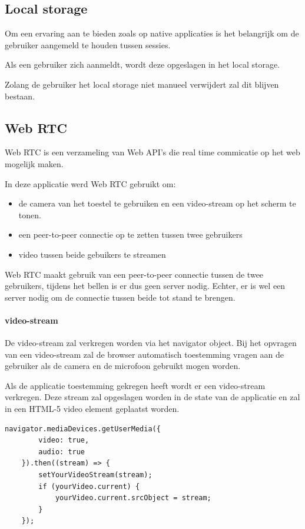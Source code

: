 	\subsection{Local storage}
		
		Om een ervaring aan te bieden zoals op native applicaties is het belangrijk om de gebruiker aangemeld te houden tussen sessies.
		
		Als een gebruiker zich aanmeldt, wordt deze opgeslagen in het local storage.
		
		Zolang de gebruiker het local storage niet manueel verwijdert zal dit blijven bestaan. 
		\autocite{Mozilla2020d}
		
	\subsection{Web RTC}
		
		Web RTC is een verzameling van Web API's die real time commicatie op het web mogelijk maken. 
		
		In deze applicatie werd Web RTC gebruikt om:
		\begin{itemize}
			\item de camera van het toestel te gebruiken en een video-stream op het scherm te tonen.
			\item een peer-to-peer connectie op te zetten tussen twee gebruikers
			\item video tussen beide gebuikers te streamen
		\end{itemize} 
		\autocite{webRTC2020}
		
		Web RTC maakt gebruik van een peer-to-peer connectie tussen de twee gebruikers, tijdens het bellen is er dus geen server nodig. Echter, er is wel een server nodig om de connectie tussen beide tot stand te brengen.
		
		\paragraph{video-stream}
			De video-stream zal verkregen worden via het navigator object. Bij het opvragen van een video-stream zal de browser automatisch toestemming vragen aan de gebruiker als de camera en de microfoon gebruikt mogen worden.
			
			Als de applicatie toestemming gekregen heeft wordt er een video-stream verkregen.
			Deze stream zal opgeslagen worden in de state van de applicatie en zal in een HTML-5 video element geplaatst worden.
		
\begin{lstlisting}
navigator.mediaDevices.getUserMedia({ 
		video: true,
		audio: true 
	}).then((stream) => {
		setYourVideoStream(stream);
		if (yourVideo.current) {
			yourVideo.current.srcObject = stream;
		}
	});
\end{lstlisting}


